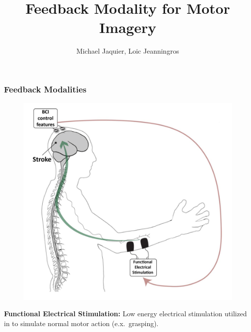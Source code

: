 \documentclass{beamer}
\title[Feedback Modality]{Feedback Modality for Motor Imagery} %
\author{Michael Jaquier, Loic Jeanningros} %
\institute[EPFL] %
{
EPFL \\ %
}
\begin{document}
\begin{frame}
\titlepage %
\end{frame}




\begin{frame}
	\frametitle{Feedback Modalities}
	\begin{figure}
		\includegraphics[width=0.55\linewidth]{fig/fespic}
	\end{figure}
	\textbf{Functional Electrical Stimulation:} Low energy electrical stimulation utilized in to simulate normal motor action (e.x.\ grasping).
\end{frame}

\end{document}
